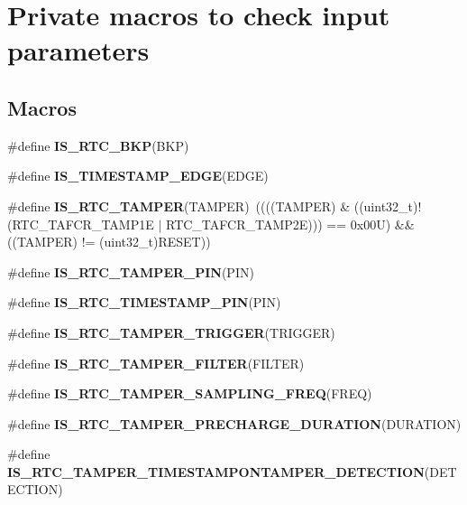 \hypertarget{group___r_t_c_ex___i_s___r_t_c___definitions}{}\section{Private macros to check input parameters}
\label{group___r_t_c_ex___i_s___r_t_c___definitions}
\subsection*{Macros}
\begin{DoxyCompactItemize}
\item 
\#define {\bfseries I\+S\+\_\+\+R\+T\+C\+\_\+\+B\+KP}(B\+KP)
\item 
\#define {\bfseries I\+S\+\_\+\+T\+I\+M\+E\+S\+T\+A\+M\+P\+\_\+\+E\+D\+GE}(E\+D\+GE)
\item 
\mbox{\label{group___r_t_c_ex___i_s___r_t_c___definitions_ga8cb706b03efeeb8534eca0a20450d377}} 
\#define {\bfseries I\+S\+\_\+\+R\+T\+C\+\_\+\+T\+A\+M\+P\+ER}(T\+A\+M\+P\+ER)~((((T\+A\+M\+P\+ER) \& ((uint32\+\_\+t)!(R\+T\+C\+\_\+\+T\+A\+F\+C\+R\+\_\+\+T\+A\+M\+P1E $\vert$ R\+T\+C\+\_\+\+T\+A\+F\+C\+R\+\_\+\+T\+A\+M\+P2E))) == 0x00\+U) \&\& ((\+T\+A\+M\+P\+E\+R) != (uint32\+\_\+t)\+R\+E\+S\+E\+T))
\item 
\#define {\bfseries I\+S\+\_\+\+R\+T\+C\+\_\+\+T\+A\+M\+P\+E\+R\+\_\+\+P\+IN}(P\+IN)
\item 
\#define {\bfseries I\+S\+\_\+\+R\+T\+C\+\_\+\+T\+I\+M\+E\+S\+T\+A\+M\+P\+\_\+\+P\+IN}(P\+IN)
\item 
\#define {\bfseries I\+S\+\_\+\+R\+T\+C\+\_\+\+T\+A\+M\+P\+E\+R\+\_\+\+T\+R\+I\+G\+G\+ER}(T\+R\+I\+G\+G\+ER)
\item 
\#define {\bfseries I\+S\+\_\+\+R\+T\+C\+\_\+\+T\+A\+M\+P\+E\+R\+\_\+\+F\+I\+L\+T\+ER}(F\+I\+L\+T\+ER)
\item 
\#define {\bfseries I\+S\+\_\+\+R\+T\+C\+\_\+\+T\+A\+M\+P\+E\+R\+\_\+\+S\+A\+M\+P\+L\+I\+N\+G\+\_\+\+F\+R\+EQ}(F\+R\+EQ)
\item 
\#define {\bfseries I\+S\+\_\+\+R\+T\+C\+\_\+\+T\+A\+M\+P\+E\+R\+\_\+\+P\+R\+E\+C\+H\+A\+R\+G\+E\+\_\+\+D\+U\+R\+A\+T\+I\+ON}(D\+U\+R\+A\+T\+I\+ON)
\item 
\#define {\bfseries I\+S\+\_\+\+R\+T\+C\+\_\+\+T\+A\+M\+P\+E\+R\+\_\+\+T\+I\+M\+E\+S\+T\+A\+M\+P\+O\+N\+T\+A\+M\+P\+E\+R\+\_\+\+D\+E\+T\+E\+C\+T\+I\+ON}(D\+E\+T\+E\+C\+T\+I\+ON)

\end{DoxyCompactItemize}
